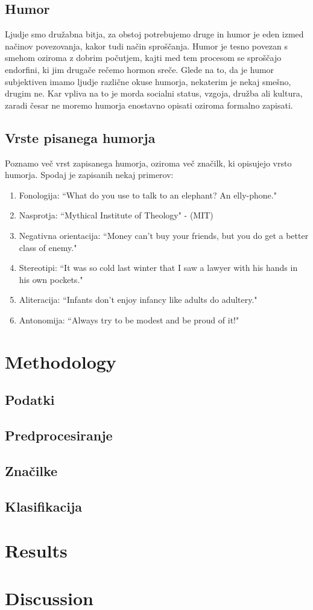 \documentclass[a4paper]{article}
\begin{document}
\subsection{Humor}

Ljudje smo družabna bitja, za obstoj potrebujemo druge in humor je eden izmed načinov povezovanja, kakor tudi način sproščanja. Humor je tesno povezan s smehom oziroma z dobrim počutjem, kajti med tem procesom se sproščajo endorfini, ki jim drugače rečemo hormon sreče. Glede na to, da je humor subjektiven imamo ljudje različne okuse humorja, nekaterim je nekaj smešno, drugim ne. Kar vpliva na to je morda socialni status, vzgoja, družba ali kultura, zaradi česar ne moremo humorja enostavno opisati oziroma formalno zapisati.

\subsection{Vrste pisanega humorja}

Poznamo več vrst zapisanega humorja, oziroma več značilk, ki opisujejo vrsto humorja. Spodaj je zapisanih nekaj primerov:

\begin{enumerate}
\item Fonologija:	“What do you use to talk to an elephant? An elly-phone."
\item Nasprotja: “Mythical Institute of Theology"  - (MIT)
\item Negativna orientacija: “Money can't buy your friends, but you do get a better class of enemy."
\item Stereotipi: “It was so cold last winter that I saw a lawyer with his hands in his own pockets."
\item Aliteracija: “Infants don’t enjoy infancy like adults do adultery."
\item Antonomija: “Always try to be modest and be proud of it!"
\end{enumerate}

\section{Methodology}

\subsection{Podatki}

\subsection{Predprocesiranje}

\subsection{Značilke}

\subsection{Klasifikacija}

\section{Results}



\section{Discussion}
\end{document}

